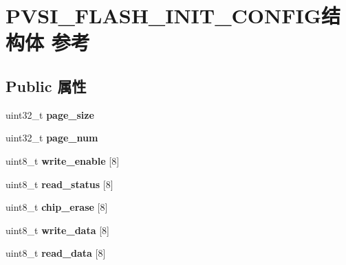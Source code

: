 \hypertarget{structVSI__FLASH__INIT__CONFIG}{}\section{P\+V\+S\+I\+\_\+\+F\+L\+A\+S\+H\+\_\+\+I\+N\+I\+T\+\_\+\+C\+O\+N\+F\+I\+G结构体 参考}
\label{structVSI__FLASH__INIT__CONFIG}
\subsection*{Public 属性}
\begin{DoxyCompactItemize}
\item 
\mbox{\label{structVSI__FLASH__INIT__CONFIG_a744e2c9f69f6c67cf548c112d09f0672}} 
uint32\+\_\+t {\bfseries page\+\_\+size}
\item 
\mbox{\label{structVSI__FLASH__INIT__CONFIG_a0f8b4d1c138ddc27a309fdfd1665530b}} 
uint32\+\_\+t {\bfseries page\+\_\+num}
\item 
\mbox{\label{structVSI__FLASH__INIT__CONFIG_ab54a5c6f8c52ba1afddb6ecc78c7381b}} 
uint8\+\_\+t {\bfseries write\+\_\+enable} \mbox{[}8\mbox{]}
\item 
\mbox{\label{structVSI__FLASH__INIT__CONFIG_a963c55761a1af04dcfa098fa9fac5602}} 
uint8\+\_\+t {\bfseries read\+\_\+status} \mbox{[}8\mbox{]}
\item 
\mbox{\label{structVSI__FLASH__INIT__CONFIG_aaee74700dcb66ab1875a5c6caddab30a}} 
uint8\+\_\+t {\bfseries chip\+\_\+erase} \mbox{[}8\mbox{]}
\item 
\mbox{\label{structVSI__FLASH__INIT__CONFIG_a096eb3778e89110ae4bdcbc17f60c5a2}} 
uint8\+\_\+t {\bfseries write\+\_\+data} \mbox{[}8\mbox{]}
\item 
\mbox{\label{structVSI__FLASH__INIT__CONFIG_a83ce64ea4975f660a92b78652724ff2c}} 
uint8\+\_\+t {\bfseries read\+\_\+data} \mbox{[}8\mbox{]}
\item 

\end{DoxyCompactItemize}
